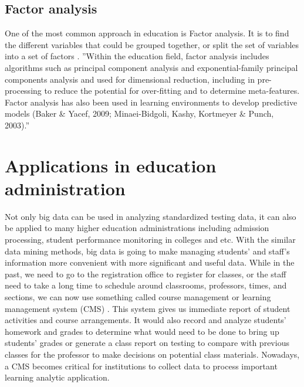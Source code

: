 \documentclass[sigconf]{acmart}
\begin{document}
\subsection{Factor analysis}
One of the most common approach in education is Factor analysis. It is to find the different variables that could be grouped together, or split the set of variables into a set of factors \cite {Daniel2015}. ''Within the education field, factor analysis includes algorithms such as principal component analysis and exponential-family principal components analysis and used for dimensional reduction, including in pre-processing to reduce the potential for over-fitting and to determine meta-features. Factor analysis has also been used in learning environments to develop predictive models (Baker & Yacef, 2009; Minaei-Bidgoli, Kashy, Kortmeyer & Punch, 2003).''\cite {Daniel2015}


\section{Applications in education administration}
Not only big data can be used in analyzing standardized testing data, it can also be applied to many higher education administrations including admission processing, student performance monitoring in colleges and etc\cite {Picciano2012}. With the similar data mining methods, big data is going to make managing students' and staff's information more convenient with more significant and useful data. While in the past, we need to go to the registration office to register for classes, or the staff need to take a long time to schedule around classrooms, professors, times, and sections, we can now use something called course management or learning management system (CMS) \cite {Picciano2012}. This system gives us immediate report of student activities and course arrangements. It would also record and analyze students' homework and grades to determine what would need to be done to bring up students' grades or 
generate a class report on testing to compare with previous classes for the professor to make decisions on potential class materials. Nowadays, a CMS becomes critical for institutions to collect data to process important learning analytic application.
\end{document}
